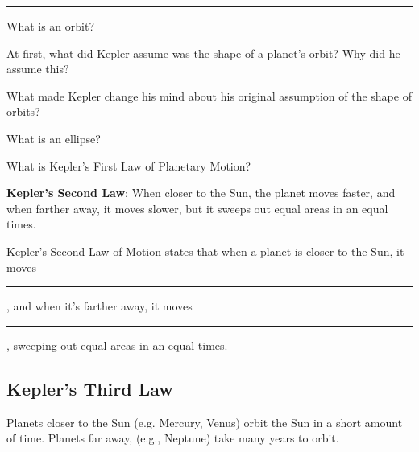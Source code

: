 \documentclass{article}
\begin{document}
\vspace{1em}
\hrule

\begin{problem}
    What is an orbit?
\end{problem}

\begin{problem}
At first, what did Kepler assume was the shape of a planet's orbit? Why did he assume this?
\end{problem}

\begin{problem}
    What made Kepler change his mind about his original assumption of the shape of orbits?
\end{problem}

\begin{problem}
    What is an ellipse?
\end{problem}

\begin{problem}
    What is Kepler's First Law of Planetary Motion?
\end{problem}



\clearpage

\begin{mdframed}[backgroundcolor=black!10]
\textbf{Kepler's Second Law}: When closer to the Sun, the planet moves faster, and when farther away, it moves slower, but it sweeps out equal areas in an equal times.
\end{mdframed}

\begin{problem}
Kepler's Second Law of Motion
states that when a planet is closer to the Sun, it moves \rule{2cm}{0.15mm}, and when it's farther away, it
moves \rule{2cm}{0.15mm}, sweeping out equal areas in an equal times.
\end{problem}

\subsection*{Kepler's Third Law}

Planets closer to the Sun (e.g. Mercury, Venus) orbit the Sun in a short amount of time. Planets far away, (e.g., Neptune) take many years to orbit. 
\end{document}
